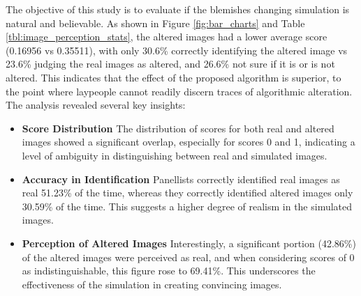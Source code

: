 \begin{spacing}{1.5}
\begin{table}[t!]
    \label{tbl:image_perception_stats}
\end{table}
The objective of this study is to evaluate if the blemishes changing simulation is natural and believable. As shown in Figure \ref{fig:bar_charts} and Table \ref{tbl:image_perception_stats}, the altered images had a lower average score (0.16956 vs 0.35511), with only 30.6\% correctly identifying the altered image vs 23.6\% judging the real images as altered, and 26.6\% not sure if it is or is not altered. This indicates that the effect of the proposed algorithm is superior, to the point where laypeople cannot readily discern traces of algorithmic alteration.
The analysis revealed several key insights:
\begin{itemize}
    \item \textbf{Score Distribution} The distribution of scores for both real and altered images showed a significant overlap, especially for scores 0 and 1, indicating a level of ambiguity in distinguishing between real and simulated images.
    \item \textbf{Accuracy in Identification} Panellists correctly identified real images as real 51.23\% of the time, whereas they correctly identified altered images only 30.59\% of the time. This suggests a higher degree of realism in the simulated images.
    \item \textbf{Perception of Altered Images} Interestingly, a significant portion (42.86\%) of the altered images were perceived as real, and when considering scores of 0 as indistinguishable, this figure rose to 69.41\%. This underscores the effectiveness of the simulation in creating convincing images.
\end{itemize}
\end{spacing}
\newpage
